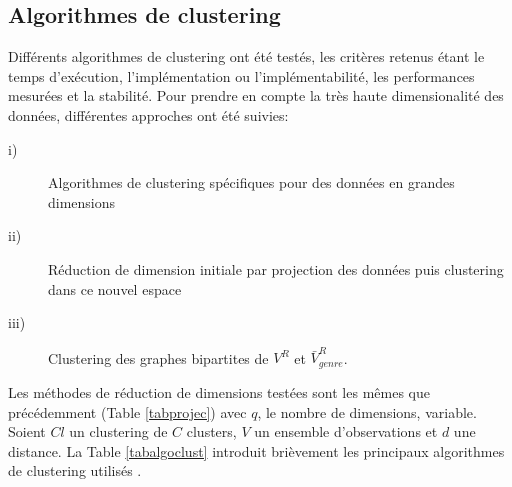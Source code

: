  \subsection{Algorithmes de clustering}\label{paralgoclust}
      
      Différents algorithmes de clustering ont été testés, les critères retenus étant le temps d'exécution, l'implémentation ou l'implémentabilité, les performances mesurées et la stabilité. Pour prendre en compte la très haute dimensionalité des données, différentes approches ont été suivies:
      
      \begin{description}
       \item[i)] Algorithmes de clustering spécifiques pour des données en grandes dimensions 
       \item[ii)] Réduction de dimension initiale par projection des données puis clustering dans ce nouvel espace
	  \item[iii)] Clustering des graphes bipartites de $V^{R}$ et $\bar{V}^{R}_{genre}$.
       \end{description}

        Les méthodes de réduction de dimensions testées sont les mêmes que précédemment (Table \ref{tabprojec}) avec $q$, le nombre de dimensions, variable. Soient $Cl$ un clustering de $C$ clusters, $V$ un ensemble d'observations et $d$ une distance. La Table \ref{tabalgoclust} introduit brièvement les principaux algorithmes de clustering utilisés
.

